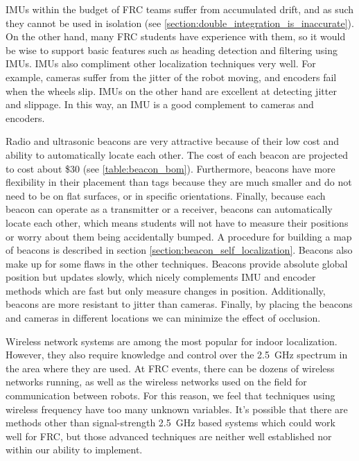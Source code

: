 \documentclass{article}
\begin{document}
  IMUs within the budget of FRC teams suffer from accumulated drift, and as such they cannot be used in isolation (see \ref{section:double_integration_is_inaccurate}). On the other hand, many FRC students have experience with them, so it would be wise to support basic features such as heading detection and filtering using IMUs. IMUs also compliment other localization techniques very well. For example, cameras suffer from the jitter of the robot moving, and encoders fail when the wheels slip. IMUs on the other hand are excellent at detecting jitter and slippage. In this way, an IMU is a good complement to cameras and encoders.

  Radio and ultrasonic beacons are very attractive because of their low cost and ability to automatically locate each other. The cost of each beacon are projected to cost about \$30 (see \ref{table:beacon_bom}). Furthermore, beacons have more flexibility in their placement than tags because they are much smaller and do not need to be on flat surfaces, or in specific orientations. Finally, because each beacon can operate as a transmitter or a receiver, beacons can automatically locate each other, which means students will not have to measure their positions or worry about them being accidentally bumped. A procedure for building a map of beacons is described in section \ref{section:beacon_self_localization}. Beacons also make up for some flaws in the other techniques. Beacons provide absolute global position but updates slowly, which nicely complements IMU and encoder methods which are fast but only measure changes in position. Additionally, beacons are more resistant to jitter than cameras. Finally, by placing the beacons and cameras in different locations we can minimize the effect of occlusion.

  Wireless network systems are among the most popular for indoor localization. However, they also require knowledge and control over the \SI{2.5}{\giga\hertz} spectrum in the area where they are used. At FRC events, there can be dozens of wireless networks running, as well as the wireless networks used on the field for communication between robots. For this reason, we feel that techniques using wireless frequency have too many unknown variables. It's possible that there are methods other than signal-strength \SI{2.5}{\giga\hertz} based systems which could work well for FRC, but those advanced techniques are neither well established nor within our ability to implement.
\end{document}
